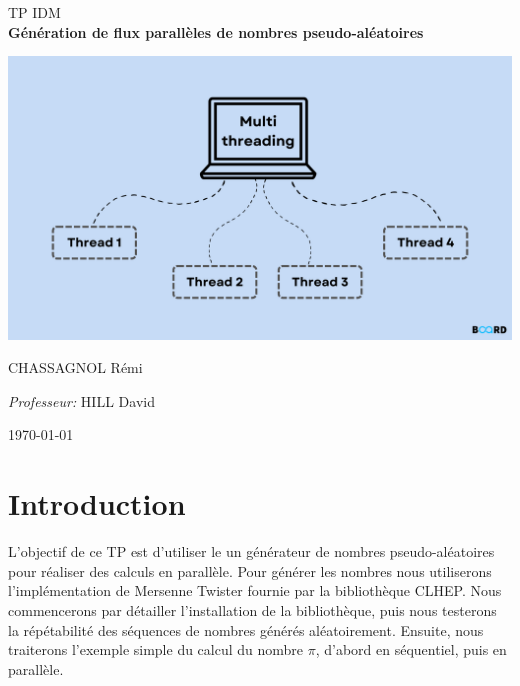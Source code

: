 \documentclass[a4paper]{article}
\begin{document}
\begin{titlepage}
\begin{center}

    \textsc{\LARGE TP IDM}\\[0.5cm]

    {\huge \bfseries Génération de flux parallèles de nombres pseudo-aléatoires\\[3cm]}

      \centering
      \includegraphics[scale=0.3]{./img/banner.png}

      \vspace*{\fill}

    \begin{multicols}{2}
      \large
      CHASSAGNOL Rémi\\

      \columnbreak

      \large
      \emph{Professeur:} HILL David\\
    \end{multicols}

    \textsc{\today}

  \end{center}
\end{titlepage}

\clearpage
\tableofcontents
\clearpage

\section{Introduction}

L'objectif de ce TP est d'utiliser le un générateur de nombres pseudo-aléatoires
pour réaliser des calculs en parallèle. Pour générer les nombres nous
utiliserons l'implémentation de Mersenne Twister fournie par la bibliothèque
CLHEP. Nous commencerons par détailler l'installation de la bibliothèque, puis
nous testerons la répétabilité des séquences de nombres générés aléatoirement.
Ensuite, nous traiterons l'exemple simple du calcul du nombre $\pi$, d'abord en
séquentiel, puis en parallèle.
\end{document}
